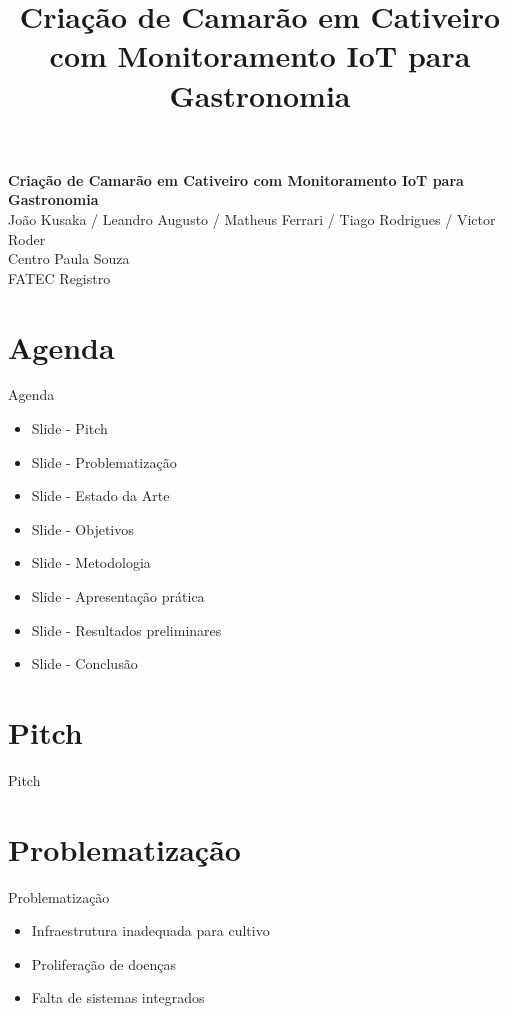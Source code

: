 \documentclass{beamer}
\title[Criação de Camarão em Cativeiro com Monitoramento IoT para Gastronomia]{\textbf{Criação de Camarão em Cativeiro com Monitoramento IoT para Gastronomia}}
\author{}
\date{}
\begin{document}
\begin{frame}
    \centering
    \vspace{1cm}
    {\color{cpsred}\Huge\textbf{Criação de Camarão em Cativeiro com Monitoramento IoT para Gastronomia}}\\[0.8cm]
    {\Large João Kusaka / Leandro Augusto / Matheus Ferrari / Tiago Rodrigues / Victor Roder}\\[0.4cm] \textcolor{cpsgray}{Centro Paula Souza}\\[0.2cm] \textcolor{cpsgray}{FATEC Registro}
\end{frame}

\section{Agenda}
\begin{frame}{Agenda}
\justifying
\begin{itemize}
    \item Slide - Pitch
    \item Slide - Problematização
    \item Slide - Estado da Arte
    \item Slide - Objetivos
    \item Slide - Metodologia
    \item Slide - Apresentação prática
    \item Slide - Resultados preliminares
    \item Slide - Conclusão
\end{itemize}
\end{frame}

\section{Pitch}
\begin{frame}{Pitch}
\justifying
\end{frame}

\section{Problematização}
\begin{frame}{Problematização}
\justifying
\begin{itemize}
    \item Infraestrutura inadequada para cultivo
    \item Proliferação de doenças
    \item Falta de sistemas integrados
\end{itemize}
\end{frame}
\end{document}

